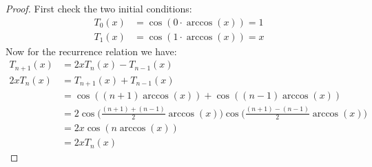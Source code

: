 \documentclass[12pt, letterpaper, onecolumn, conference, final]{IEEEtran}
\theoremstyle{definition}
\newtheorem{proposition}{Proposition}
\theoremstyle{plain}
\begin{document}
\begin{proof}
First check the two initial conditions:
\begin{equation*}
\begin{split}
T_0(x) &= \cos(0\cdot\arccos(x)) = 1 \\
T_1(x) &= \cos(1\cdot\arccos(x)) = x
\end{split}
\end{equation*}
Now for the recurrence relation we have:
\begin{equation*}
\begin{split}
T_{n + 1}(x) &= 2xT_n(x) - T_{n - 1}(x) \\
2xT_n(x) &= T_{n + 1}(x) + T_{n - 1}(x) \\
&= \cos((n + 1)\arccos(x)) + \cos((n - 1)\arccos(x)) \\
&= 2\cos\Big( \frac{(n + 1) + (n - 1)}{2} \arccos(x) \Big)\cos\Big( \frac{(n + 1) - (n - 1)}{2} \arccos(x) \Big) \\
&= 2x\cos(n\arccos(x)) \\
&= 2xT_n(x)
\end{split}
\end{equation*}
\end{proof}

\begin{center}
\end{center}
\end{document}
